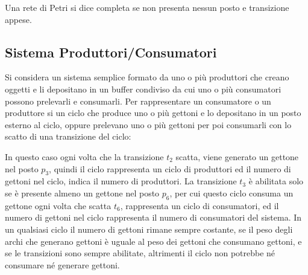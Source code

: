 \documentclass{article}
\numberwithin{equation}{subsection}
\begin{document}
Una rete di Petri si dice completa se non presenta nessun posto e transizione appese. 

\subsection{Sistema Produttori/Consumatori}

Si considera un sistema semplice formato da uno o più produttori che creano oggetti e li depositano in un buffer condiviso da cui uno o più consumatori possono prelevarli 
e consumarli. Per rappresentare un consumatore o un produttore si un ciclo che produce uno o più gettoni e lo depositano in un posto esterno al ciclo, oppure  prelevano uno o 
più gettoni per poi consumarli con lo scatto di una transizione del ciclo:

\begin{center}
\end{center}

In questo caso ogni volta che la transizione $t_2$ scatta, viene generato un gettone nel posto $p_3$, quindi il ciclo rappresenta un ciclo di produttori ed il numero di 
gettoni nel ciclo, indica il numero di produttori. La transizione $t_3$ è abilitata solo se è presente almeno un gettone nel posto $p_6$, per cui questo ciclo 
consuma un gettone ogni volta che scatta $t_6$, rappresenta un ciclo di consumatori, ed il numero di gettoni nel ciclo rappresenta il numero di consumatori del sistema. 
In un qualsiasi ciclo il numero di gettoni rimane sempre costante, se il peso degli archi che generano gettoni è uguale al peso dei gettoni che consumano gettoni, e se le 
transizioni sono sempre abilitate, altrimenti il ciclo non potrebbe né consumare né generare gettoni. 
\end{document}
